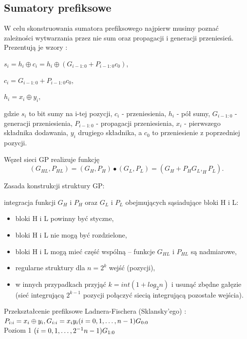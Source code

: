 \documentclass[12pt,oneside,reqno]{article}
\begin{document}
\subsection{Sumatory prefiksowe}
W celu skonstruowania sumatora prefiksowego najpierw musimy poznać zależności wytwarzania przez nie sum oraz propagacji i generacji przeniesień. Prezentują je wzory \cite{szybkie-sumatory-2009}: 

$s_i=h_i\oplus c_i=h_i\oplus (G_{i-1:0}+P_{i-1:0}c_0)$,

$c_i=G_{i-1:0}+P_{i-1:0}c_0$,

$h_i=x_i\oplus y_i$,

\noindent gdzie $s_i$ to bit sumy na i-tej pozycji, $c_i$ - przeniesienia, $h_i$ - pół sumy, $G_{i-1:0}$ - generacji przeniesienia, $P_{i-1:0}$ - propagacji przeniesienia, $x_i$ - pierwszego składnika dodawania, $y_i$ drugiego składnika, a $c_0$ to przeniesienie z poprzedniej pozycji.

Węzeł sieci GP realizuje funkcję
\begin{equation}
(G_{HL}, P_{HL})=(G_H, P_H)\bullet(G_L, P_L)=(G_H+P_HG_L, _HP_L).
\label{formula:prefix-node}
\end{equation}

Zasada konstrukcji struktury GP:

\quad integracja funkcji $G_H$ i $P_H$ oraz $G_L$ i $P_L$ obejmujących sąsiadujące bloki H i L:
\begin{itemize}
    \item bloki H i L powinny być styczne,
    \item bloki H i L nie mogą być rozdzielone,
    \item bloki H i L mogą mieć część wspólną – funkcje $G_{HL}$ i $P_{HL}$ są nadmiarowe,
    \item regularne struktury dla $n=2^k$ wejść (pozycji),
    \item w innych przypadkach przyjąć $k=int(1+log_2n)$ i usunąć zbędne gałęzie (sieć integrującą $2^{k-1}$ pozycji połączyć siecią integrującą pozostałe wejścia).
\end{itemize}

\setlength{\parskip}{0em}
Przekształcenie prefiksowe Ladnera-Fischera (Sklansky’ego) \cite{szybkie-sumatory-2006}:\\

$P_{i:i}=x_i\oplus y_i , G_{i:i}=x_iy_i (i=0,1,\dots,n-1)\hfill G_{0:0}$\\

Poziom 1 $(i=0,1,\dots,2^{- 1}n-1)\hfill G_{1:0}$
\end{document}
